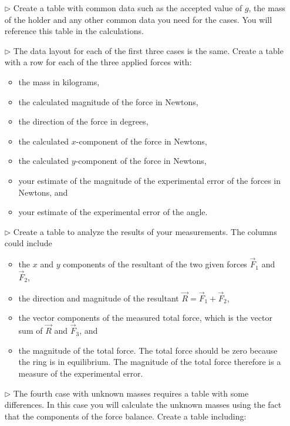 \begin{itemize}
\item[$\triangleright$] Create a table with common data such as the accepted value of $g$, the mass of the holder and any other common data you need for the cases. You will reference this table in the calculations.
\item[$\triangleright$] The data layout for each of the first three cases is the same. Create a table with a row for each of the three applied forces with:
    \begin{itemize}
      \item the mass in kilograms,
      \item the calculated magnitude of the force in Newtons,
      \item the direction of the force in degrees,
      \item the calculated $x$-component of the force in Newtons,
      \item the calculated $y$-component of the force in Newtons,
      \item your estimate of the magnitude of the experimental error of the forces in Newtons, and
      \item your estimate of the experimental error of the angle.
    \end{itemize}
\item[$\triangleright$] Create a table to analyze the results of your measurements. The columns could include
    \begin{itemize}
      \item the $x$ and $y$ components of the resultant of the two given forces $\vec{F}_1$ and $\vec{F}_2$,
      \item the direction and magnitude of the resultant $\vec{R} = \vec{F}_1 + \vec{F}_2$,
      \item the vector components of the measured total force, which is the vector sum of $\vec{R}$ and $\vec{F}_3$, and
      \item the magnitude of the total force. The total force should be zero because the ring is in equilibrium. The magnitude of the total force therefore is a measure of the experimental error.
    \end{itemize}
\item[$\triangleright$] The fourth case with unknown masses requires a table with some differences. In this case you will calculate the unknown masses using the fact that the components of the force balance. Create a table including:
    \begin{itemize}

\end{itemize}
\end{itemize}
